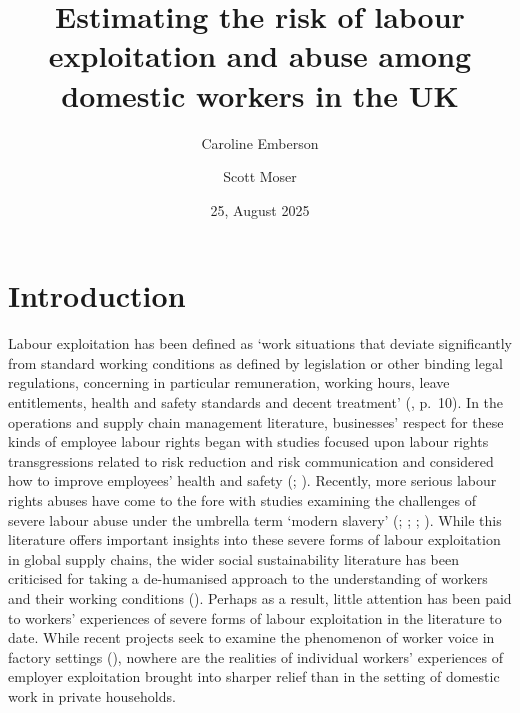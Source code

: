 \documentclass[
  12pt,
  letterpaper,
  DIV=11,
  numbers=noendperiod]{scrartcl}
\title{Estimating the risk of labour exploitation and abuse among
domestic workers in the UK}
\author{Caroline Emberson \and Scott Moser}
\date{25, August 2025}
\renewcommand*\contentsname{Table of contents}
\newcommand\contentsname{Table of contents}
\begin{document}
\maketitle

\renewcommand*\contentsname{Table of contents}
{
\hypersetup{linkcolor=}
\setcounter{tocdepth}{3}
\tableofcontents
}

\newpage

\section{Introduction}\label{introduction}

Labour exploitation has been defined as `work situations that deviate
significantly from standard working conditions as defined by legislation
or other binding legal regulations, concerning in particular
remuneration, working hours, leave entitlements, health and safety
standards and decent treatment'
(\textcite{european_union_for_fundamental_rights_severe_2015}, p.~10).
In the operations and supply chain management literature, businesses'
respect for these kinds of employee labour rights began with studies
focused upon labour rights transgressions related to risk reduction and
risk communication and considered how to improve employees' health and
safety (\textcite{chinander_aligning_2001};
\textcite{wolf_operationalizing_2001}). Recently, more serious labour
rights abuses have come to the fore with studies examining the
challenges of severe labour abuse under the umbrella term `modern
slavery' (\textcite{gold_modern_2015}; \textcite{new_modern_2015};
\textcite{benstead_horizontal_2018}; \textcite{stevenson_modern_2018}).
While this literature offers important insights into these severe forms
of labour exploitation in global supply chains, the wider social
sustainability literature has been criticised for taking a de-humanised
approach to the understanding of workers and their working conditions
(\textcite{soundararajan_humanizing_2021}). Perhaps as a result, little
attention has been paid to workers' experiences of severe forms of
labour exploitation in the literature to date. While recent projects
seek to examine the phenomenon of worker voice in factory settings
(\textcite{leverhulme_trust_research_2022}), nowhere are the realities
of individual workers' experiences of employer exploitation brought into
sharper relief than in the setting of domestic work in private
households.
\end{document}
